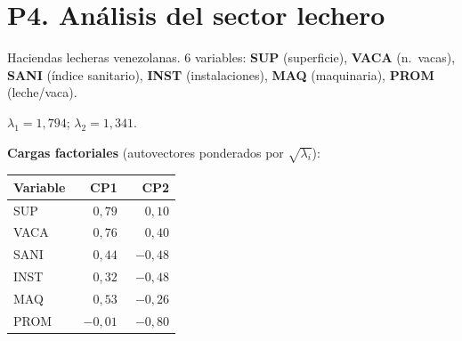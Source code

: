 \documentclass[11pt,a4paper]{article}
\begin{document}
\newpage
\section{P4. Análisis del sector lechero}

\begin{enuncbox}
Haciendas lecheras venezolanas. 6 variables: \textbf{SUP} (superficie), \textbf{VACA} (n.\ vacas), \textbf{SANI} (índice sanitario), \textbf{INST} (instalaciones), \textbf{MAQ} (maquinaria), \textbf{PROM} (leche/vaca).

\smallskip
$\lambda_1=1{,}794$; $\lambda_2=1{,}341$.

\smallskip
\textbf{Cargas factoriales} (autovectores ponderados por $\sqrt{\lambda_i}$):

\begin{center}\small
\begin{tabular}{lrr}\toprule
Variable & CP1 & CP2\\\midrule
SUP  & $\phantom{-}0{,}79$ & $\phantom{-}0{,}10$\\
VACA & $\phantom{-}0{,}76$ & $\phantom{-}0{,}40$\\
SANI & $\phantom{-}0{,}44$ & $-0{,}48$\\
INST & $\phantom{-}0{,}32$ & $-0{,}48$\\
MAQ  & $\phantom{-}0{,}53$ & $-0{,}26$\\
PROM & $-0{,}01$ & $-0{,}80$\\\bottomrule
\end{tabular}\end{center}
\end{enuncbox}
\end{document}
